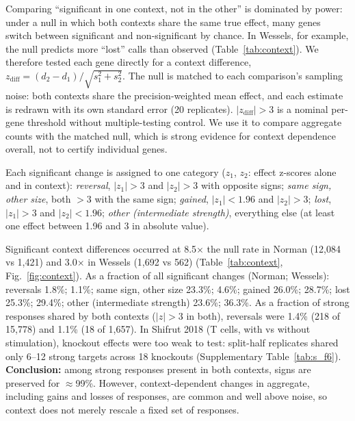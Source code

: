 \documentclass[10pt]{article}
\begin{document}
Comparing ``significant in one context, not in the other'' is dominated by power: under a null in which both contexts share the same true effect, many genes switch between significant and non-significant by chance. In Wessels, for example, the null predicts more ``lost'' calls than observed (Table~\ref{tab:context}).
We therefore tested each gene directly for a context difference, $z_\text{diff}=(d_2-d_1)/\sqrt{s_1^2+s_2^2}$. The null is matched to each comparison's sampling noise: both contexts share the precision-weighted mean effect, and each estimate is redrawn with its own standard error (20 replicates). $|z_\text{diff}|>3$ is a nominal per-gene threshold without multiple-testing control. We use it to compare aggregate counts with the matched null, which is strong evidence for context dependence overall, not to certify individual genes.

Each significant change is assigned to one category ($z_1$, $z_2$: effect z-scores alone and in context): \emph{reversal}, $|z_1|>3$ and $|z_2|>3$ with opposite signs; \emph{same sign, other size}, both $>3$ with the same sign; \emph{gained}, $|z_1|<1.96$ and $|z_2|>3$; \emph{lost}, $|z_1|>3$ and $|z_2|<1.96$; \emph{other (intermediate strength)}, everything else (at least one effect between 1.96 and 3 in absolute value).

Significant context differences occurred at 8.5$\times$ the null rate in Norman (12{,}084 vs 1{,}421) and 3.0$\times$ in Wessels (1{,}692 vs 562) (Table~\ref{tab:context}, Fig.~\ref{fig:context}).
As a fraction of all significant changes (Norman; Wessels): reversals 1.8\%; 1.1\%; same sign, other size 23.3\%; 4.6\%; gained 26.0\%; 28.7\%; lost 25.3\%; 29.4\%; other (intermediate strength) 23.6\%; 36.3\%.
As a fraction of strong responses shared by both contexts ($|z|>3$ in both), reversals were 1.4\% (218 of 15{,}778) and 1.1\% (18 of 1{,}657).
In Shifrut 2018 \citep{shifrut2018} (T cells, with vs without stimulation), knockout effects were too weak to test: split-half replicates shared only 6--12 strong targets across 18 knockouts (Supplementary Table~\ref{tab:s_f6}).
\textbf{Conclusion:} among strong responses present in both contexts, signs are preserved for $\approx$99\%. However, context-dependent changes in aggregate, including gains and losses of responses, are common and well above noise, so context does not merely rescale a fixed set of responses.

\begin{table}[t]
\centering\small
\caption{\textbf{Context-dependent responses vs a noise-matched null} (counts of gene $\times$ comparison, summed over comparisons; null mean $\pm$ s.d.\ over 20 replicates). The null shares a precision-weighted mean effect across contexts, which makes it generous to ``gained''/``lost'' counts (conservative for claiming context dependence).}
\label{tab:context}
\resizebox{\textwidth}{!}{}
\end{table}
\end{document}
